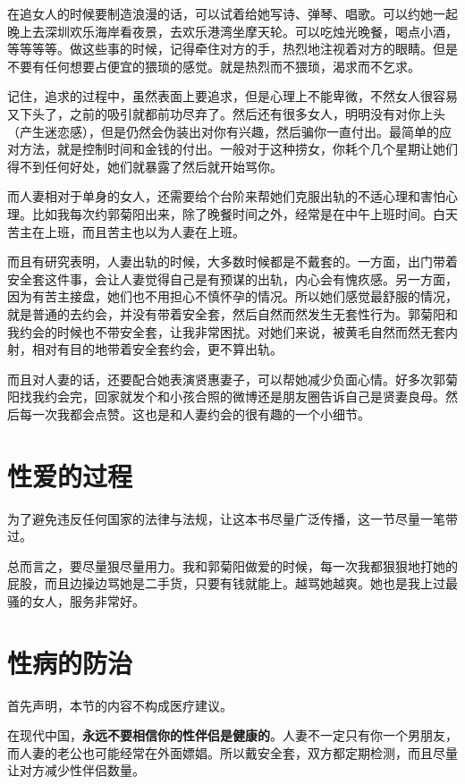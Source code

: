 在追女人的时候要制造浪漫的话，可以试着给她写诗、弹琴、唱歌。可以约她一起晚上去深圳欢乐海岸看夜景，去欢乐港湾坐摩天轮。可以吃烛光晚餐，喝点小酒，等等等等。做这些事的时候，记得牵住对方的手，热烈地注视着对方的眼睛。但是不要有任何想要占便宜的猥琐的感觉。就是热烈而不猥琐，渴求而不乞求。

记住，追求的过程中，虽然表面上要追求，但是心理上不能卑微，不然女人很容易又下头了，之前的吸引就都前功尽弃了。然后还有很多女人，明明没有对你上头（产生迷恋感），但是仍然会伪装出对你有兴趣，然后骗你一直付出。最简单的应对方法，就是控制时间和金钱的付出。一般对于这种捞女，你耗个几个星期让她们得不到任何好处，她们就暴露了然后就开始骂你。

而人妻相对于单身的女人，还需要给个台阶来帮她们克服出轨的不适心理和害怕心理。比如我每次约郭菊阳出来，除了晚餐时间之外，经常是在中午上班时间。白天苦主在上班，而且苦主也以为人妻在上班。

而且有研究表明，人妻出轨的时候，大多数时候都是不戴套的。一方面，出门带着安全套这件事，会让人妻觉得自己是有预谋的出轨，内心会有愧疚感。另一方面，因为有苦主接盘，她们也不用担心不慎怀孕的情况。所以她们感觉最舒服的情况，就是普通的去约会，并没有带着安全套，然后自然而然发生无套性行为。郭菊阳和我约会的时候也不带安全套，让我非常困扰。对她们来说，被黄毛自然而然无套内射，相对有目的地带着安全套约会，更不算出轨。

而且对人妻的话，还要配合她表演贤惠妻子，可以帮她减少负面心情。好多次郭菊阳找我约会完，回家就发个和小孩合照的微博还是朋友圈告诉自己是贤妻良母。然后每一次我都会点赞。这也是和人妻约会的很有趣的一个小细节。

\section{性爱的过程}

为了避免违反任何国家的法律与法规，让这本书尽量广泛传播，这一节尽量一笔带过。

总而言之，要尽量狠尽量用力。我和郭菊阳做爱的时候，每一次我都狠狠地打她的屁股，而且边操边骂她是二手货，只要有钱就能上。越骂她越爽。她也是我上过最骚的女人，服务非常好。

\section{性病的防治}

首先声明，本节的内容不构成医疗建议。

在现代中国，\textbf{永远不要相信你的性伴侣是健康的}。人妻不一定只有你一个男朋友，而人妻的老公也可能经常在外面嫖娼。所以戴安全套，双方都定期检测，而且尽量让对方减少性伴侣数量。

